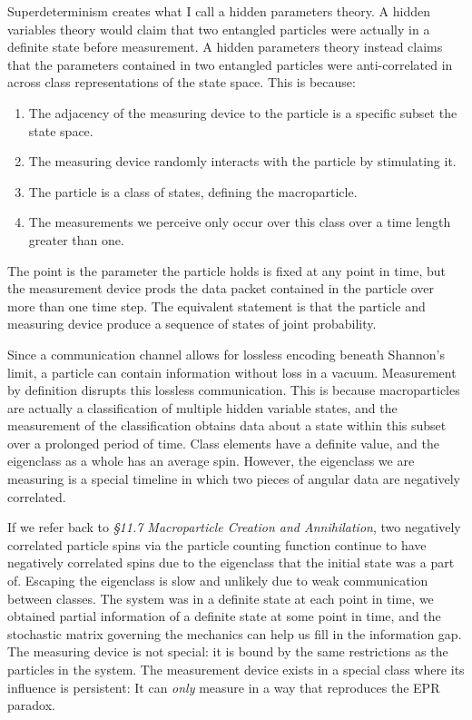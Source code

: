 \documentclass[10pt, a5paper, twoside, openright]{memoir}
\begin{document}
Superdeterminism creates what I call a hidden parameters theory. A hidden variables theory would claim that two entangled particles were actually in a definite state before measurement. A hidden parameters theory instead claims that the parameters contained in two entangled particles were anti-correlated in across class representations of the state space. This is because:
\begin{enumerate}
\item The adjacency of the measuring device to the particle is a specific subset the state space.
\item The measuring device randomly interacts with the particle by stimulating it.
\item The particle is a class of states, defining the macroparticle.
\item The measurements we perceive only occur over this class over a time length greater than one.
\end{enumerate}
The point is the parameter the particle holds is fixed at any point in time, but the measurement device prods the data packet contained in the particle over more than one time step. The equivalent statement is that the particle and measuring device produce a sequence of states of joint probability.

Since a communication channel allows for lossless encoding beneath Shannon's limit, a particle can contain information without loss in a vacuum. Measurement by definition disrupts this lossless communication. This is because macroparticles are actually a classification of multiple hidden variable states, and the measurement of the classification obtains data about a state within this subset over a prolonged period of time. Class elements have a definite value, and the eigenclass as a whole has an average spin. However, the eigenclass we are measuring is a special timeline in which two pieces of angular data are negatively correlated.

If we refer back to \textit{\S 11.7 Macroparticle Creation and Annihilation}, two negatively correlated particle spins via the particle counting function continue to have negatively correlated spins due to the eigenclass that the initial state was a part of. Escaping the eigenclass is slow and unlikely due to weak communication between classes. The system was in a definite state at each point in time, we obtained partial information of a definite state at some point in time, and the stochastic matrix governing the mechanics can help us fill in the information gap. The measuring device is not special: it is bound by the same restrictions as the particles in the system. The measurement device exists in a special class where its influence is persistent: It can \textit{only} measure in a way that reproduces the EPR paradox.
\end{document}

